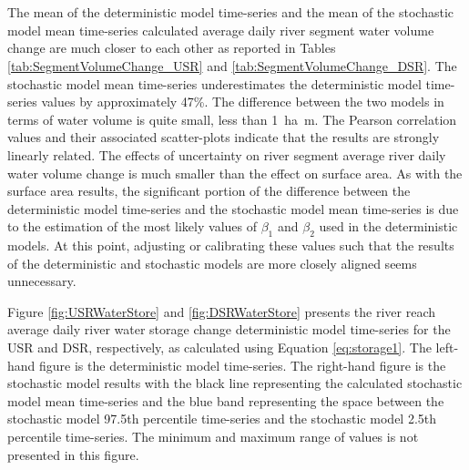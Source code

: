 \begin{linenumbers}
\subtabletop
\begin{table}[htbp]
	\centering
	\caption[DSR river segment volume change deterministic and stochastic model numerical results.]{DSR river segment volume change deterministic and stochastic model numerical results.  Values are in hectare-meters (\si{\hectare\meter}) and the values in parentheses are in acres (\si{\acre}).}
	\label{tab:SegmentVolumeChange_DSR}
	\begin{subtable}{\textwidth}
		\centering
		
	\end{subtable}\\
	\tablevspace	
	\begin{subtable}{\textwidth}
		\centering
		
	\end{subtable}\\
\end{table}	

The mean of the deterministic model time-series and the mean of the stochastic model mean time-series calculated average daily river segment water volume change are much closer to each other as reported in Tables \ref{tab:SegmentVolumeChange_USR} and \ref{tab:SegmentVolumeChange_DSR}.  The stochastic model mean time-series underestimates the deterministic model time-series values by approximately 47\%.  The difference between the two models in terms of water volume is quite small, less than \SI{1}{\hectare\meter}.  The Pearson correlation values and their associated scatter-plots indicate that the results are strongly linearly related.  The effects of uncertainty on river segment average river daily water volume change is much smaller than the effect on surface area.  As with the surface area results, the significant portion of the difference between the deterministic model time-series and the stochastic model mean time-series is due to the estimation of the most likely values of $ \beta_1 $ and $ \beta_2 $ used in the deterministic models.  At this point, adjusting or calibrating these values such that the results of the deterministic and stochastic models are more closely aligned seems unnecessary.

Figure \ref{fig:USRWaterStore} and \ref{fig:DSRWaterStore} presents the river reach average daily river water storage change deterministic model time-series for the USR and DSR, respectively, as calculated using Equation \ref{eq:storage1}.  The left-hand figure is the deterministic model time-series.  The right-hand figure is the stochastic model results with the black line representing the calculated stochastic model mean time-series and the blue band representing the space between the stochastic model 97.5th percentile time-series and the stochastic model 2.5th percentile time-series.  The minimum and maximum range of values is not presented in this figure.


\end{linenumbers}
